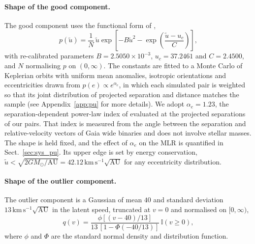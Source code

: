 \documentclass{aa}
\newcommand{\msun}{M_{\odot}}
\newcommand{\kmsau}{\mathrm{km}\,\mathrm{s}^{-1}\sqrt{\mathrm{AU}}}
\newcommand{\indicator}{\mathbb{I}}
\begin{document}
\paragraph{Shape of the good component.} The good component uses the functional form of \citet{Hwang2024DynamicalMasses},
\begin{equation}
 p(\widetilde u)=\frac{1}{N}\,\widetilde u\exp\!\left[-B\widetilde u^2-\exp\!\left(\frac{\widetilde u-u_c}{C}\right)\right],
 \label{eq:good}
\end{equation}
with re-calibrated parameters $B=2.5050\times10^{-3}$, $u_c=37.2461$ and $C=2.4500$, and $N$ normalising $p$ on $(0,\infty)$. The constants are fitted to a Monte Carlo of Keplerian orbits with uniform mean anomalies, isotropic orientations and eccentricities drawn from $p(e)\propto e^{\alpha_e}$, in which each simulated pair is weighted so that its joint distribution of projected separation and distance matches the sample (see Appendix~\ref{app:pu} for more details). We adopt $\alpha_e=1.23$, the separation-dependent power-law index of \citet{Hwang2022Eccentricity} evaluated at the projected separations of our pairs. That index is measured from the angle between the separation and relative-velocity vectors of Gaia wide binaries and does not involve stellar masses. The shape is held fixed, and the effect of $\alpha_e$ on the MLR is quantified in Sect.~\ref{sec:sys_pu}. Its upper edge is set by energy conservation, $\widetilde u<\sqrt{2G\msun/\mathrm{AU}}=42.12\,\kmsau$ for any eccentricity distribution.

\paragraph{Shape of the outlier component.} The outlier component is a Gaussian of mean $40$ and standard deviation $13\,\kmsau$ in the latent speed, truncated at $v=0$ and normalised on $[0,\infty)$,
\begin{equation}
 q(v)=\frac{\phi[(v-40)/13]}{13\,[1-\Phi(-40/13)]}\,\indicator(v\ge0),
 \label{eq:out}
\end{equation}
where $\phi$ and $\Phi$ are the standard normal density and distribution function.
\end{document}
